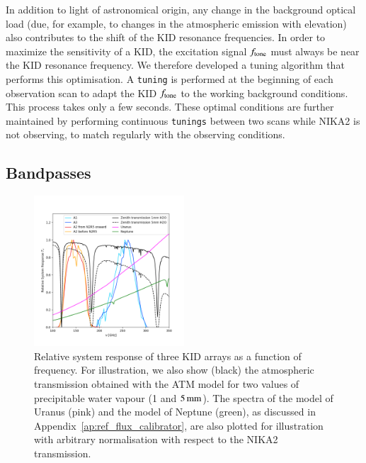 \documentclass[traditionalabstract]{aa}
\begin{document}
In addition to light of astronomical origin, any change in the
background optical load (due, for example, to changes in
the atmospheric emission with elevation) also contributes to
the shift of the KID resonance frequencies. In
order to maximize the sensitivity of a KID, the excitation signal $f_{\rm{tone}}$
must always be near the KID resonance frequency. We therefore developed a tuning algorithm that performs this optimisation. A {\tt tuning} is performed at the beginning
of each observation scan to adapt the KID $f_{\rm{tone}}$ to the working background
conditions.
This process takes only a few seconds.
These optimal conditions are further maintained by performing
continuous {\tt tunings} between two scans while NIKA2 is not observing, to
match regularly with the observing conditions.

\subsection{Bandpasses}
\label{se:instru_bandpass}

\begin{figure}[ht!] %
\begin{center}
\includegraphics[clip,trim={0, 1cm, 0, 2cm},width=0.5\textwidth]{Figures/bandpasses_nika2_colorsok.png}
\caption[NIKA2 transmission]{Relative system response of three KID
  arrays as a
  function of frequency. For illustration, we also show (black)  the atmospheric transmission obtained with the ATM model \citep{ATM,
    Pardo2001} for two values of precipitable water vapour (1 and
  $5\,\rm{mm}$).
  The spectra of the model of Uranus (pink) and the model of
  Neptune
  (green), as discussed in Appendix~\ref{ap:ref_flux_calibrator}, are
  also plotted for illustration with arbitrary
  normalisation with respect to the NIKA2 transmission.} 
 \label{spectralband1}
\end{center}
\end{figure}
\end{document}
